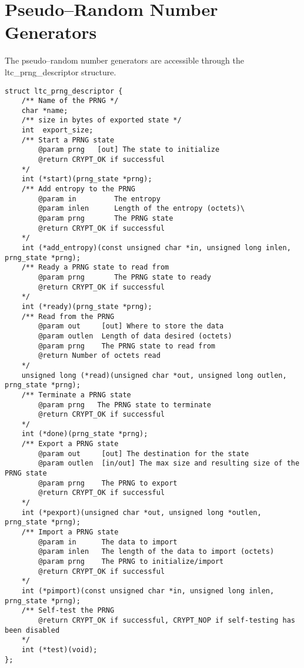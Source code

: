 \documentclass[a4paper]{book}
\begin{document}
\section{Pseudo--Random Number Generators}
The pseudo--random number generators are accessible through the ltc\_prng\_descriptor structure.

\begin{small}
\begin{verbatim}
struct ltc_prng_descriptor {
    /** Name of the PRNG */
    char *name;
    /** size in bytes of exported state */
    int  export_size;
    /** Start a PRNG state
        @param prng   [out] The state to initialize
        @return CRYPT_OK if successful
    */
    int (*start)(prng_state *prng);
    /** Add entropy to the PRNG
        @param in         The entropy
        @param inlen      Length of the entropy (octets)\
        @param prng       The PRNG state
        @return CRYPT_OK if successful
    */
    int (*add_entropy)(const unsigned char *in, unsigned long inlen, prng_state *prng);
    /** Ready a PRNG state to read from
        @param prng       The PRNG state to ready
        @return CRYPT_OK if successful
    */
    int (*ready)(prng_state *prng);
    /** Read from the PRNG
        @param out     [out] Where to store the data
        @param outlen  Length of data desired (octets)
        @param prng    The PRNG state to read from
        @return Number of octets read
    */
    unsigned long (*read)(unsigned char *out, unsigned long outlen, prng_state *prng);
    /** Terminate a PRNG state
        @param prng   The PRNG state to terminate
        @return CRYPT_OK if successful
    */
    int (*done)(prng_state *prng);
    /** Export a PRNG state  
        @param out     [out] The destination for the state
        @param outlen  [in/out] The max size and resulting size of the PRNG state
        @param prng    The PRNG to export
        @return CRYPT_OK if successful
    */
    int (*pexport)(unsigned char *out, unsigned long *outlen, prng_state *prng);
    /** Import a PRNG state
        @param in      The data to import
        @param inlen   The length of the data to import (octets)
        @param prng    The PRNG to initialize/import
        @return CRYPT_OK if successful
    */
    int (*pimport)(const unsigned char *in, unsigned long inlen, prng_state *prng);
    /** Self-test the PRNG
        @return CRYPT_OK if successful, CRYPT_NOP if self-testing has been disabled
    */
    int (*test)(void);
};
\end{verbatim}
\end{small}
\end{document}
